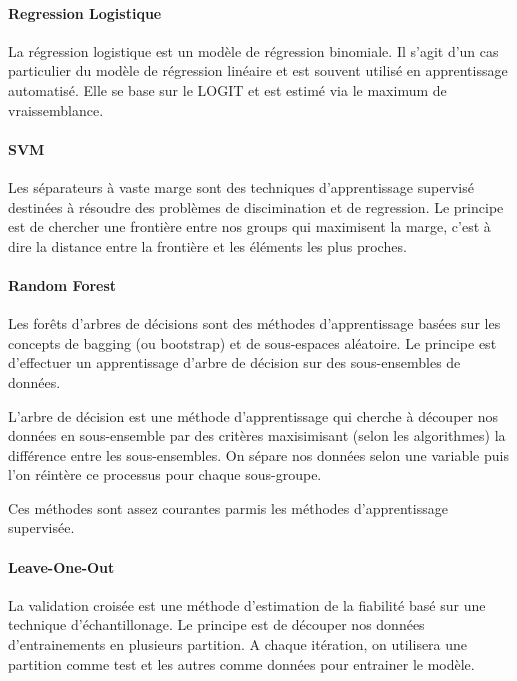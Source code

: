 \documentclass[]{article}
\let\oldparagraph\paragraph
\renewcommand{\paragraph}[1]{\oldparagraph{#1}\mbox{}}
\begin{document}
\hypertarget{regression-logistique}{%
\paragraph{Regression Logistique}\label{regression-logistique}}

La régression logistique est un modèle de régression binomiale. Il
s'agit d'un cas particulier du modèle de régression linéaire et est
souvent utilisé en apprentissage automatisé. Elle se base sur le LOGIT
et est estimé via le maximum de vraissemblance.

\hypertarget{svm}{%
\paragraph{SVM}\label{svm}}

Les séparateurs à vaste marge sont des techniques d'apprentissage
supervisé destinées à résoudre des problèmes de discimination et de
regression. Le principe est de chercher une frontière entre nos groups
qui maximisent la marge, c'est à dire la distance entre la frontière et
les éléments les plus proches.

\hypertarget{random-forest}{%
\paragraph{Random Forest}\label{random-forest}}

Les forêts d'arbres de décisions sont des méthodes d'apprentissage
basées sur les concepts de bagging (ou bootstrap) et de sous-espaces
aléatoire. Le principe est d'effectuer un apprentissage d'arbre de
décision sur des sous-ensembles de données.

L'arbre de décision est une méthode d'apprentissage qui cherche à
découper nos données en sous-ensemble par des critères maxisimisant
(selon les algorithmes) la différence entre les sous-ensembles. On
sépare nos données selon une variable puis l'on réintère ce processus
pour chaque sous-groupe.

Ces méthodes sont assez courantes parmis les méthodes d'apprentissage
supervisée.

\hypertarget{leave-one-out}{%
\paragraph{Leave-One-Out}\label{leave-one-out}}

La validation croisée est une méthode d'estimation de la fiabilité basé
sur une technique d'échantillonage. Le principe est de découper nos
données d'entrainements en plusieurs partition. A chaque itération, on
utilisera une partition comme test et les autres comme données pour
entrainer le modèle.
\end{document}
